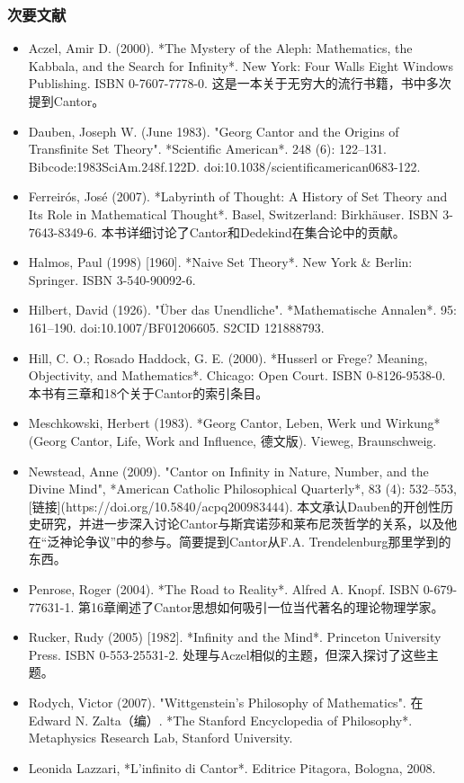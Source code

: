 \subsubsection{次要文献}  
\begin{itemize}
\item Aczel, Amir D. (2000). *The Mystery of the Aleph: Mathematics, the Kabbala, and the Search for Infinity*. New York: Four Walls Eight Windows Publishing. ISBN 0-7607-7778-0. 这是一本关于无穷大的流行书籍，书中多次提到Cantor。  
\item Dauben, Joseph W. (June 1983). "Georg Cantor and the Origins of Transfinite Set Theory". *Scientific American*. 248 (6): 122–131. Bibcode:1983SciAm.248f.122D. doi:10.1038/scientificamerican0683-122.  
\item Ferreirós, José (2007). *Labyrinth of Thought: A History of Set Theory and Its Role in Mathematical Thought*. Basel, Switzerland: Birkhäuser. ISBN 3-7643-8349-6. 本书详细讨论了Cantor和Dedekind在集合论中的贡献。  
\item Halmos, Paul (1998) [1960]. *Naive Set Theory*. New York & Berlin: Springer. ISBN 3-540-90092-6.  
\item Hilbert, David (1926). "Über das Unendliche". *Mathematische Annalen*. 95: 161–190. doi:10.1007/BF01206605. S2CID 121888793.  
\item Hill, C. O.; Rosado Haddock, G. E. (2000). *Husserl or Frege? Meaning, Objectivity, and Mathematics*. Chicago: Open Court. ISBN 0-8126-9538-0. 本书有三章和18个关于Cantor的索引条目。  
\item Meschkowski, Herbert (1983). *Georg Cantor, Leben, Werk und Wirkung* (Georg Cantor, Life, Work and Influence, 德文版). Vieweg, Braunschweig.  
\item Newstead, Anne (2009). "Cantor on Infinity in Nature, Number, and the Divine Mind", *American Catholic Philosophical Quarterly*, 83 (4): 532–553, [链接](https://doi.org/10.5840/acpq200983444). 本文承认Dauben的开创性历史研究，并进一步深入讨论Cantor与斯宾诺莎和莱布尼茨哲学的关系，以及他在“泛神论争议”中的参与。简要提到Cantor从F.A. Trendelenburg那里学到的东西。  
\item Penrose, Roger (2004). *The Road to Reality*. Alfred A. Knopf. ISBN 0-679-77631-1. 第16章阐述了Cantor思想如何吸引一位当代著名的理论物理学家。  
\item Rucker, Rudy (2005) [1982]. *Infinity and the Mind*. Princeton University Press. ISBN 0-553-25531-2. 处理与Aczel相似的主题，但深入探讨了这些主题。  
\item Rodych, Victor (2007). "Wittgenstein's Philosophy of Mathematics". 在Edward N. Zalta（编）. *The Stanford Encyclopedia of Philosophy*. Metaphysics Research Lab, Stanford University.  
\item Leonida Lazzari, *L'infinito di Cantor*. Editrice Pitagora, Bologna, 2008.
\end{itemize}
